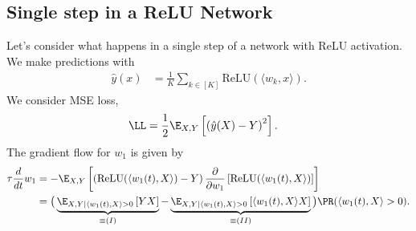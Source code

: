 \documentclass{article}
\begin{document}
\subsection{Single step in a ReLU Network}
Let's consider what happens in a single step of a network with ReLU activation.
We make predictions with
\begin{align}
  \hat{y}(x) &= \frac{1}{K} \sum_{k \in [K]} \text{ReLU}(\langle w_k, x \rangle).
\end{align}
We consider MSE loss,
\begin{align}
  \LL &= \frac{1}{2} \E_{X,Y} \left[ \left( \hat{y}(X) - Y \right)^2 \right].
\end{align}
The gradient flow for $w_1$ is given by
\begin{align}
  \tau \frac{d}{dt} w_1
  &= -\E_{X,Y} \left[ \left( \text{ReLU}(\langle w_1(t), X \rangle) - Y \right) \frac{\partial}{\partial w_1} \left[ \text{ReLU}(\langle w_1(t), X \rangle) \right] \right] \\
  &= \big( \underbrace{ \E_{X, Y \mid \langle w_1(t), X \rangle > 0} \left[ Y X \right] }_{\equiv (I)} - \underbrace{ \E_{X, Y \mid \langle w_1(t), X \rangle > 0} \left[ \langle w_1(t), X \rangle X \right] }_{\equiv (II)} \big) \PR( \langle w_1(t), X \rangle > 0 ).
\end{align}
\end{document}
